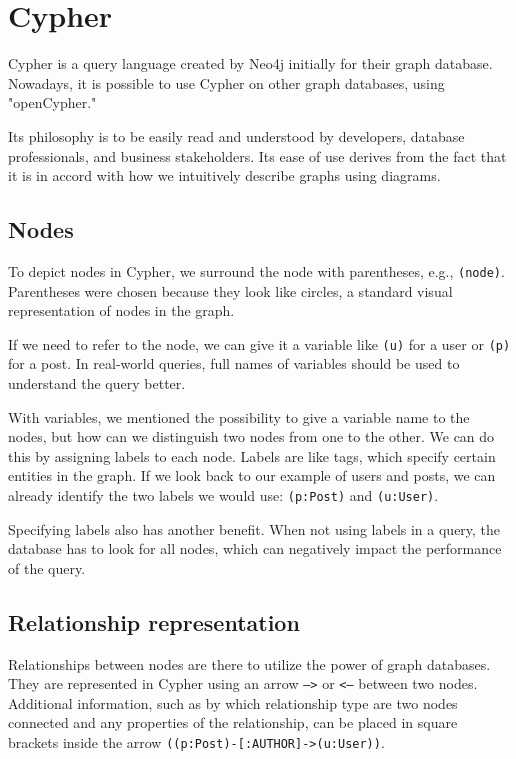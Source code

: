 \section{Cypher}

Cypher is a query language created by Neo4j initially for their graph database. Nowadays, it is possible to use Cypher on other graph databases, using "openCypher." \cite{noauthor_resources_nodate}

Its philosophy is to be easily read and understood by developers, database professionals, and business stakeholders.
Its ease of use derives from the fact that it is in accord with how we intuitively describe graphs using diagrams. \cite{robinson_graph_2015}

\subsection{Nodes}

To depict nodes in Cypher, we surround the node with parentheses, e.g., \texttt{(node)}. Parentheses were chosen because they look like circles,
a standard visual representation of nodes in the graph. \cite{noauthor_getting_nodate}

If we need to refer to the node, we can give it a variable like \texttt{(u)} for a user or \texttt{(p)} for a post.
In real-world queries, full names of variables should be used to understand the query better.

With variables, we mentioned the possibility to give a variable name to the nodes, but how can we distinguish two nodes from one to the other.
We can do this by assigning labels to each node. Labels are like tags, which specify certain entities in the graph. If we look back to our example of users and posts,
we can already identify the two labels we would use: \texttt{(p:Post)} and \texttt{(u:User)}.

Specifying labels also has another benefit. When not using labels in a query, the database has to look for all nodes, which can negatively impact the performance of the query.
\cite{noauthor_getting_nodate}

\subsection{Relationship representation}

Relationships between nodes are there to utilize the power of graph databases. They are represented in Cypher using an arrow \texttt{-->}
or \texttt{<--} between two nodes. Additional information, such as by which relationship type are two nodes connected and any properties of the relationship, can be placed in square brackets inside the arrow \texttt{((p:Post)-[:AUTHOR]->(u:User))}. \cite{noauthor_getting_nodate}

